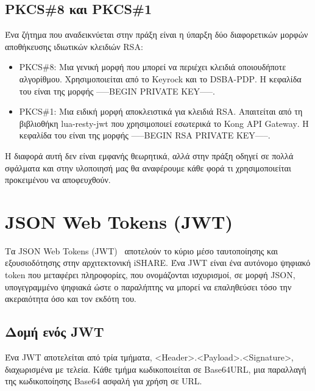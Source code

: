 \subsection{\textlatin{PKCS\#8} και \textlatin{PKCS\#1}}
\label{subsec:key-formats}

Ένα ζήτημα που αναδεικνύεται στην πράξη είναι η ύπαρξη δύο διαφορετικών
μορφών αποθήκευσης ιδιωτικών κλειδιών \textlatin{RSA}:

\begin{itemize}
    \item \textlatin{PKCS\#8}: Μια γενική μορφή που μπορεί να περιέχει κλειδιά
    οποιουδήποτε αλγορίθμου. Χρησιμοποιείται από το \textlatin{Keyrock} και το
    \textlatin{DSBA-PDP}. Η κεφαλίδα του είναι της μορφής \textlatin{-----BEGIN PRIVATE
    KEY-----}.
    \item \textlatin{PKCS\#1}: Μια ειδική μορφή αποκλειστικά για κλειδιά
    \textlatin{RSA}. Απαιτείται από τη βιβλιοθήκη
    \textlatin{lua-resty-jwt} που χρησιμοποιεί εσωτερικά το \textlatin{Kong
    API Gateway}. Η κεφαλίδα του είναι της μορφής \textlatin{-----BEGIN RSA
    PRIVATE KEY-----}.
\end{itemize}

Η διαφορά αυτή δεν είναι εμφανής θεωρητικά, αλλά στην πράξη οδηγεί σε
πολλά σφάλματα και στην υλοποιησή μας θα αναφέρουμε κάθε φορά τι χρησιμοποιείται
προκειμένου να αποφευχθούν.

\section{\textlatin{JSON Web Tokens (JWT)}}
\label{sec:jwt}

Τα \textlatin{JSON Web Tokens (JWT)}~\cite{rfc7519} αποτελούν το κύριο
μέσο ταυτοποίησης και εξουσιοδότησης στην αρχιτεκτονική
\textlatin{iSHARE}. Ένα \textlatin{JWT} είναι ένα αυτόνομο ψηφιακό
\textlatin{token} που μεταφέρει πληροφορίες, που ονομάζονται ισχυρισμοί, σε μορφή
\textlatin{JSON}, υπογεγραμμένο ψηφιακά ώστε ο παραλήπτης να μπορεί να
επαληθεύσει τόσο την ακεραιότητα όσο και τον εκδότη του.

\subsection{Δομή ενός \textlatin{JWT}}
\label{subsec:jwt-structure}

Ένα \textlatin{JWT} αποτελείται από τρία τμήματα, <\textlatin{Header}>.<\textlatin{Payload}>.<\textlatin{Signature}>, 
διαχωρισμένα με τελεία. Κάθε τμήμα κωδικοποιείται σε \textlatin{Base64URL}, μια παραλλαγή της
κωδικοποίησης \textlatin{Base64} ασφαλή για χρήση σε \textlatin{URL}.


